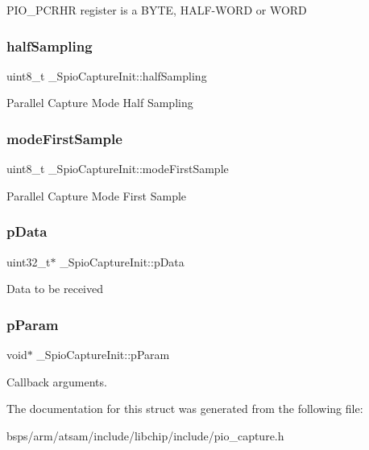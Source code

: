 P\+I\+O\+\_\+\+P\+C\+R\+HR register is a B\+Y\+TE, H\+A\+L\+F-\/\+W\+O\+RD or W\+O\+RD \mbox{\label{struct__SpioCaptureInit_a429498d58892dca1006e5c95b9d166be}} 
\subsubsection{\texorpdfstring{halfSampling}{halfSampling}}
{\footnotesize\ttfamily uint8\+\_\+t \+\_\+\+Spio\+Capture\+Init\+::half\+Sampling}

Parallel Capture Mode Half Sampling \mbox{\label{struct__SpioCaptureInit_af38cf37ee3bbfa29eeb6cc32377743e3}} 
\subsubsection{\texorpdfstring{modeFirstSample}{modeFirstSample}}
{\footnotesize\ttfamily uint8\+\_\+t \+\_\+\+Spio\+Capture\+Init\+::mode\+First\+Sample}

Parallel Capture Mode First Sample \mbox{\label{struct__SpioCaptureInit_a715f93923ccb98814ee7eb2ef16d389b}} 
\subsubsection{\texorpdfstring{pData}{pData}}
{\footnotesize\ttfamily uint32\+\_\+t$\ast$ \+\_\+\+Spio\+Capture\+Init\+::p\+Data}

Data to be received \mbox{\label{struct__SpioCaptureInit_a956c111d8a0f8a753b6e02a11f25c459}} 
\subsubsection{\texorpdfstring{pParam}{pParam}}
{\footnotesize\ttfamily void$\ast$ \+\_\+\+Spio\+Capture\+Init\+::p\+Param}

Callback arguments. 

The documentation for this struct was generated from the following file\+:\begin{DoxyCompactItemize}
\item 
bsps/arm/atsam/include/libchip/include/pio\+\_\+capture.\+h\end{DoxyCompactItemize}
